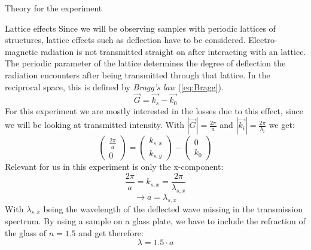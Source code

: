 \documentclass[pdftex, a4paper,11pt, twoside, UKenglish]{report}
\begin{document}
\begin{chapter}{Theory for the experiment}
    \begin{section}{Lattice effects}
      \label{chp:TheoryLatticeeffects}
      Since we will be observing samples with periodic lattices of structures,
      lattice effects such as deflection have to be considered. Electro-magnetic
      radiation is not transmitted straight on after interacting with an
      lattice.
      The periodic parameter of the lattice determines the degree of deflection
      the radiation encounters after being transmitted through that lattice.
      In the reciprocal space, this is defined by \textit{Bragg's law}
      (\cref{eq:Bragg}).
      \begin{equation}
        \label{eq:Bragg}
        \vec{G}=\vec{k_{s}}-\vec{k_{0}}
      \end{equation}
      For this experiment we are mostly interested in the losses due to this
      effect, since we will be looking at transmitted intensity.
      With $|\vec{G}|=\frac{2\pi}{a}$ and
      $|\vec{k_{i}}|=\frac{2\pi}{\lambda_{i}}$ we get:
      \begin{equation}
        \begin{pmatrix} \frac{2\pi}{a} \\ 0 \end{pmatrix} =
        \begin{pmatrix} k_{s,x} \\ k_{s, y} \end{pmatrix} -
        \begin{pmatrix} 0 \\ k_{0} \end{pmatrix}
      \end{equation}
      Relevant for us in this experiment is only the x-component:
      \begin{equation}
        \frac{2\pi}{a} = k_{s, x} = \frac{2\pi}{\lambda_{s, x}}
      \end{equation}
      \begin{equation}
        \rightarrow a = \lambda_{s, x}
      \end{equation}
      With $\lambda_{s, x}$ being the wavelength of the deflected wave missing
      in the transmission spectrum. By using a sample on a glass plate, we have
      to include the refraction of the glass of $n=1.5$ and get therefore:
      \begin{equation}
        \lambda = 1.5 \cdot a
      \end{equation}


\end{section}
\end{chapter}
\end{document}
